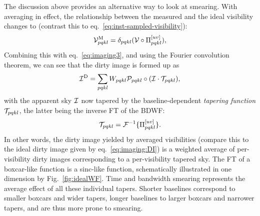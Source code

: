 \documentclass[useAMS,usenatbib]{mn2e}
\begin{document}
The discussion above provides an alternative way to look at smearing. With averaging in effect, the relationship between the measured and the ideal visibility changes to (contrast this to eq.~\ref{eq:inst-sampled-visibility}): 
\begin{equation}
\mathcal{V}^\mathrm{M}_{pqkl} = \delta_{pqkl} ( \mathcal{V}\circ\Pi^{[uv]}_{pqkl} ),
\end{equation} 
Combining this with eq.~\ref{eq:imaging3}, and using the Fourier convolution theorem, we can see that the dirty image is formed up as
\begin{equation}
\mathcal{I}^\mathrm{D} =  \sum_{pqkl} W_{pqkl} \mathcal{P}_{pqkl} \circ (\mathcal{I}\cdot\mathcal{T}_{pqkl}),
\end{equation}
with the apparent sky $\mathcal{I}$ now tapered by the baseline-dependent \emph{tapering function} $\mathcal{T}_{pqkl}$, the latter being the inverse FT of the BDWF:
\begin{equation}
\mathcal{T}_{pqkl} = \mathcal{F}^{-1}\{ \Pi^{[uv]}_{pqkl} \}.
\end{equation}
In other words, the dirty image yielded by averaged visibilities 
(compare this to the ideal dirty image given by eq.~\ref{eq:imaging:DI})
is a weighted average of per-visibility dirty images corresponding to a per-visibility tapered sky. The FT of a boxcar-like function is a sinc-like function, schematically illustrated in one dimension by Fig.~\ref{fig:idealWF}. Time and bandwidth smearing represents the average effect 
of all these individual tapers. Shorter baselines correspond to smaller boxcars and wider tapers, longer baselines to larger 
boxcars and narrower tapers, and are thus more prone to smearing.
\end{document}
